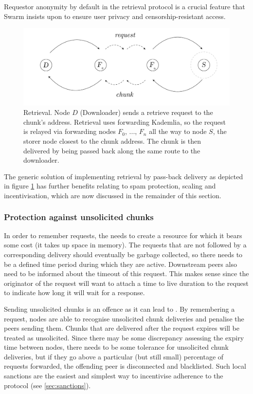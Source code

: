 Requestor anonymity by default in the retrieval protocol is a crucial feature that Swarm insists upon to ensure user privacy and censorship-resistant access.

\begin{figure}[htbp]
   \centering
   \includegraphics[width=\textwidth]{fig/retrieval.pdf}
   \caption[Retrieval \statusgreen]{Retrieval. Node $D$ (Downloader) sends a retrieve request to the chunk's address. Retrieval uses forwarding Kademlia, so the request is relayed via forwarding nodes $F_0$, ..., $F_n$ all the way to node $S$, the storer node closest to the chunk address. The chunk is then delivered by being passed back along the same route to the downloader.}
   \label{fig:retrieval}
\end{figure}

The generic solution of implementing retrieval by pass-back delivery as depicted in figure \ref{fig:retrieval} has further benefits relating to spam protection, scaling and incentivisation, which are now discussed in the remainder of this section.

\subsubsection{Protection against unsolicited chunks}

In order to remember requests, the  needs to create a resource for which it bears some cost (it takes up space in memory). The requests that are not followed by a corresponding delivery should eventually be garbage collected, so there needs to be a defined time period during which they are active. Downstream peers also need to be informed about the timeout of this request. This makes sense since the originator of the request will want to attach a time to live duration to the request to indicate how long it will wait for a response.  

Sending unsolicited chunks is an offence as it can lead to . By remembering a request, nodes are able to recognise unsolicited chunk deliveries and penalise the peers sending them. Chunks that are delivered after the request expires will be treated as unsolicited. Since there may be some discrepancy assessing the expiry time between nodes, there needs to be some tolerance for unsolicited chunk deliveries, but if they go above a particular (but still small) percentage of requests forwarded, the offending peer is disconnected and blacklisted. Such local sanctions are the easiest and simplest way to incentivise adherence to the protocol (see \ref{sec:sanctions}). 

